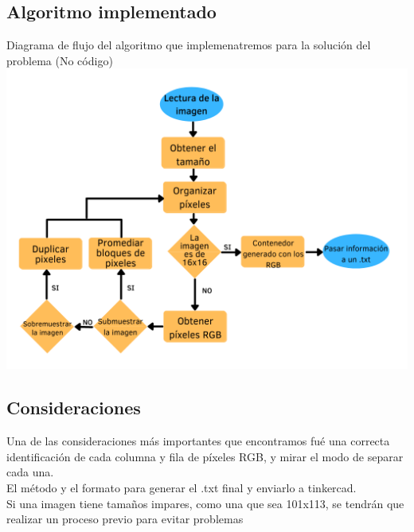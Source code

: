 \documentclass{article}
\begin{document}
\subsection{Algoritmo implementado}
Diagrama de flujo del algoritmo que implemenatremos para la solución del problema (No código)\\
\includegraphics[width=14cm]{Imagenes/Diagrama.png}

\subsection{Consideraciones}
Una de las consideraciones más importantes que encontramos fué una correcta identificación de cada columna y fila de píxeles RGB, y mirar el modo de separar cada una.\\

El método y el formato para generar el .txt final y enviarlo a tinkercad.\\

Si una imagen tiene tamaños impares, como una que sea 101x113, se tendrán que realizar un proceso previo para evitar problemas\\
\end{document}
